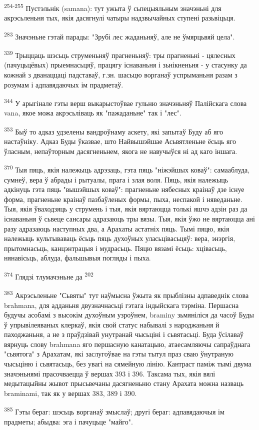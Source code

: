 \documentclass{article}
\begin{document}
\textsuperscript{254-255} Пустэльнік (samana): тут ужыта ў сьпецыяльным
значэньні для акрэсьленьня тых, якія дасягнулі чатыры надзвычайных
ступені разьвіцьця.

\textsuperscript{283} Значэньне гэтай парады: "Зрубі лес жаданьняў, але
не ўмярцьвяй цела".

\textsuperscript{339} Трыццаць шэсьць струменьняў прагненьняў: тры
прагненьні - цялесных (пачуцьцёвых) прыемнасьцяў, працягу існаваньня і
зьнікненьня - у стасунку да кожнай з дванаццаці падставаў, г.зн. шасьцю
ворганаў успрыманьня разам з розумам і адпавядаючых ім прадметаў.

\textsuperscript{344} У арыгінале гэты верш выкарыстоўвае гульню
значэньняў Палійскага слова vana, якое можа акрэсьліваць як "пажаданьне"
так і "лес".

\textsuperscript{353} Быў то адказ удзелены вандроўнаму аскету, які
запытаў Буду аб яго настаўніку. Адказ Буды ўказвае, што Найвышэйшае
Асьвятленьне ёсьць яго ўласным, непаўторным дасягненьнем, якога не
навучыўся ні ад каго іншага.

\textsuperscript{370} Тыя пяць, якія належыць адрэзаць, гэта пяць
"ніжэйшых коваў": самааблуда, сумнеў, вера ў абрады і рытуалы, прага і
злая воля. Пяць, якія належыць адкінуць гэта пяць "вышэйшых коваў":
прагненьне нябесных краінаў дзе існуе форма, прагненьне краінаў
пазбаўленых формы, пыха, неспакой і няведаньне. Тыя, якія ўваходзяць у
струмень і тыя, якія вяртаюцца толькі яшчэ адзін раз да існаваньня ў
сьвеце сансары адразаюць тры вязы. Тыя, якія ўжо не вяртаюцца ані разу
адразаюць наступных два, а Арахаты астатніх пяць. Тымі пяцю, якія
належыць культываваць ёсьць пяць духоўных уласьцівасьцяў: вера, энэргія,
прытомнасьць, канцэнтрацыя і мудрасьць. Пяцю вязамі ёсьць: хцівасьць,
нянавісьць, аблуда, фальшывыя погляды і пыха.

\textsuperscript{374} Глядзі тлумачэньне да \textsuperscript{202}

\textsuperscript{383} Акрэсьленьне "Сьвяты" тут наўмысна ўжыта як
прыблізны адпаведнік слова brahmana, для адданьня двузначнасьці гэтага
індыйскага тэрміна. Першасна будучы асобамі з высокім духоўным узроўнем,
braminy зьмяніліся да часоў Буды ў упрывілеяваных клеркаў, якія свой
статус набывалі з народжаньня й паходжаньня, а не з праўдзівай унутранай
чысьціні і сьвятасьці. Буда ўсілаваў вярнуць слову brahmana яго
першасную канатацыю, атаесамляючы сапраўднага "сьвятога" з Арахатам, які
заслугоўвае на гэты тытул праз сваю ўнутраную чысьціню і сьвятасьць, без
увагі на сямейную лінію. Кантраст паміж тымі двума значэньнямі
прасочваецца ў вершах 393 і 396. Таксама тых, якія вялі медытацыйны
жывот прысьвечаны дасягненьню стану Арахата можна назваць braminami, так
як у вершах 383, 389 і 390.

\textsuperscript{385} Гэты бераг: шэсьць ворганаў змыслаў; другі бераг:
адпавядаючыя ім прадметы; абыдва: эга і пачуцьце "майго".
\end{document}
